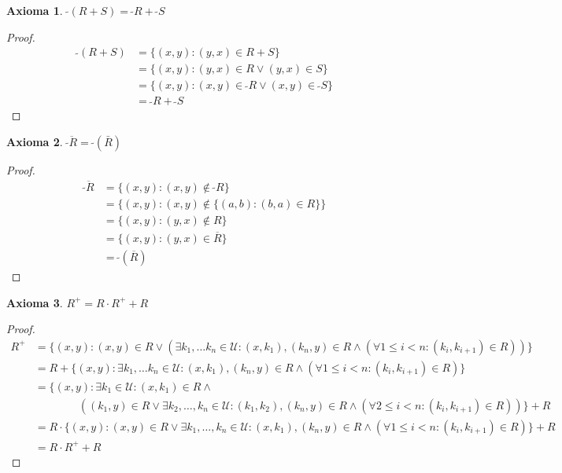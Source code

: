 \documentclass{article}
\newtheorem*{axiom}{Axioma}
\newcommand{\U}{\mathcal{U}}
\newcommand{\conv}[1]{\ \tilde{}#1}
\begin{document}
\begin{axiom}
  $\conv{(R+S)} = \conv{R}+\conv{S}$
\end{axiom}
\begin{proof}
  \begin{equation*}
    \begin{aligned}
      \conv{(R + S)} &= \{(x, y) : (y, x) \in R + S\} \\ 
                     &= \{(x, y) : (y, x) \in R \lor (y, x) \in S\} \\ 
                     &= \{(x, y) : (x, y) \in \conv{R} \lor (x, y) \in \conv{S}\} \\ 
                     &= \conv{R} + \conv{S}
    \end{aligned}
  \end{equation*}
\end{proof}

\begin{axiom}
  $\overline{\conv{R}} = \conv{(\bar{R})}$
\end{axiom}
\begin{proof}
  \begin{equation*}
    \begin{aligned}
      \overline{\conv{R}} &= \{(x, y) : (x, y) \notin \conv{R}\} \\ 
                          &= \{(x, y) : (x, y) \notin \{(a, b) : (b, a) \in R\}\} \\ 
                          &= \{(x, y) : (y, x) \notin R\} \\ 
                          &= \{(x, y) : (y, x) \in \overline{R}\} \\ 
                          &= \conv{(\overline{R})}
    \end{aligned}
  \end{equation*}
\end{proof}

\begin{axiom}
  $R^+ = R \cdot R^+ + R$
\end{axiom}
\begin{proof}
  \begin{equation*}
    \begin{aligned}
      R^+ &= \{(x, y) : (x, y) \in R \lor (\exists k_1, \dots k_n \in \U : (x, k_1), (k_n, y) \in R \land (\forall 1 \leq i < n : (k_i, k_{i+1}) \in R))\} \\ 
          &= R + \{(x, y) : \exists k_1, \dots k_n \in \U : (x, k_1), (k_n, y) \in R \land (\forall 1 \leq i < n : (k_i, k_{i+1}) \in R)\} \\ 
          &= \{(x, y) : \exists k_1 \in \U : (x, k_1) \in R \land \\
          & \qquad\qquad ((k_1, y) \in R \lor \exists k_2, \dots, k_n \in \U : (k_1, k_2), (k_n, y) \in R \land (\forall 2 \leq i < n : (k_i, k_{i+1}) \in R))\} + R \\
          &= R \cdot \{(x, y) : (x, y) \in R \lor \exists k_1, \dots, k_n \in \U : (x, k_1), (k_n, y) \in R \land (\forall 1 \leq i < n : (k_i, k_{i+1}) \in R)\} + R \\ 
          &= R \cdot R^+ + R
    \end{aligned}
  \end{equation*}
\end{proof}
\end{document}
